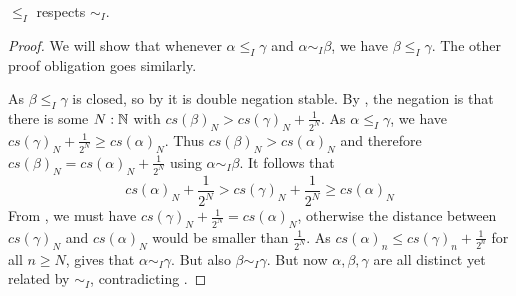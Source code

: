
\begin{lemma}
  $\leq_I$ respects $\sim_I$. 
\end{lemma}
\begin{proof}
  We will show that whenever $\alpha\leq_I \gamma$ and $\alpha\sim_I\beta$, we have $\beta\leq_I\gamma$. 
  The other proof obligation goes similarly. 


  As $\beta\leq_I\gamma$ is closed, so by  it is double negation stable. 
  By , the negation is that there is some 
  $N:\mathbb{N}$ with 
  $cs(\beta)_N > cs(\gamma)_N + \frac{1}{2^N}.$
  As $\alpha\leq_I\gamma$, we have 
  $cs(\gamma)_N + \frac{1}{2^N}\geq cs(\alpha)_N $. 
  Thus $cs(\beta)_N > cs(\alpha)_N$ and therefore $cs(\beta)_N = cs(\alpha)_N+\frac{1}{2^N}$ using  $\alpha\sim_I\beta$.
  It follows that 
  $$
  cs(\alpha)_N+\frac{1}{2^N} > cs(\gamma)_N + \frac{1}{2^N} \geq cs(\alpha)_N
  $$
  From , we must have
  $cs(\gamma)_N  + \frac{1}{2^N} = cs(\alpha)_N$, otherwise the distance 
  between $cs(\gamma)_N$ and $cs(\alpha)_N$ 
  would be smaller than $\frac{1}{2^N}$.
  As $cs(\alpha)_n \leq cs(\gamma)_n + \frac{1}{2^n}$ for all $n\geq N$, 
   gives that 
  $\alpha\sim_I\gamma$. But also $\beta\sim_I\gamma$. 
  But now $\alpha,\beta,\gamma$ are all distinct yet related by $\sim_I$, contradicting 
  . 
\end{proof}
